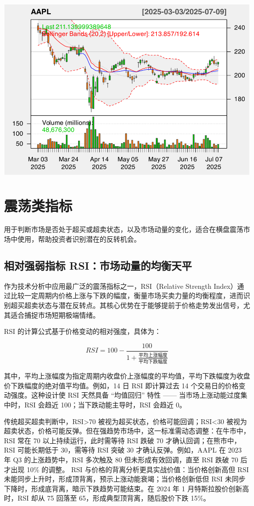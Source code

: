 \documentclass[]{ctexbook}
\begin{document}
\includegraphics[width=0.9\linewidth]{quantmod_files/figure-latex/evwma_2-4}

\section{震荡类指标}\label{ux9707ux8361ux7c7bux6307ux6807}

用于判断市场是否处于超买或超卖状态，以及市场动量的变化，适合在横盘震荡市场中使用，帮助投资者识别潜在的反转机会。

\subsection{相对强弱指标 RSI：市场动量的均衡天平}\label{ux76f8ux5bf9ux5f3aux5f31ux6307ux6807-rsiux5e02ux573aux52a8ux91cfux7684ux5747ux8861ux5929ux5e73}

作为技术分析中应用最广泛的震荡指标之一，RSI（Relative Strength Index）通过比较一定周期内价格上涨与下跌的幅度，衡量市场买卖力量的均衡程度，进而识别超买超卖状态与潜在反转点。其核心优势在于能够提前于价格走势发出信号，尤其适合捕捉市场短期极端情绪。

RSI 的计算公式基于价格变动的相对强度，具体为：

\[RSI = 100 - \frac{100}{1 + \frac{\text{平均上涨幅度}}{\text{平均下跌幅度}}}
\]

其中，平均上涨幅度为指定周期内收盘价上涨幅度的平均值，平均下跌幅度为收盘价下跌幅度的绝对值平均值。例如，14 日 RSI 即计算过去 14 个交易日的价格变动强度。这种设计使 RSI 天然具备 ``均值回归'' 特性 ------ 当市场上涨动能过度集中时，RSI 会趋近 100；当下跌动能主导时，RSI 会趋近 0。

传统超买超卖判断中，RSI\textgreater70 被视为超买状态，价格可能回调；RSI\textless30 被视为超卖状态，价格可能反弹。但在强趋势市场中，这一标准需动态调整：在牛市中，RSI 常在 70 以上持续运行，此时需等待 RSI 跌破 70 才确认回调；在熊市中，RSI 可能长期低于 30，需等待 RSI 突破 30 才确认反弹。例如，AAPL 在 2023 年 Q3 的上涨趋势中，RSI 多次触及 80 但未形成有效回调，直至 RSI 跌破 70 后才出现 10\% 的调整。
RSI 与价格的背离分析更具实战价值：当价格创新高但 RSI 未能同步上升时，形成顶背离，预示上涨动能衰竭；当价格创新低但 RSI 未同步下降时，形成底背离，暗示下跌趋势可能结束。在 2024 年 1 月特斯拉股价创新高时，RSI 却从 75 回落至 65，形成典型顶背离，随后股价下跌 15\%。
\end{document}
